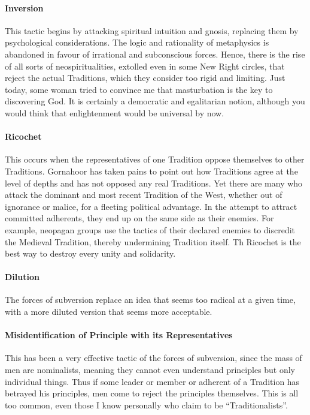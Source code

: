 \paragraph{Inversion}


This tactic begins by attacking spiritual intuition and gnosis, replacing them by psychological considerations. The logic and rationality of metaphysics is abandoned in favour of irrational and subconscious forces. Hence, there is the rise of all sorts of neospiritualities, extolled even in some New Right circles, that reject the actual Traditions, which they consider too rigid and limiting. Just today, some woman tried to convince me that masturbation is the key to discovering God. It is certainly a democratic and egalitarian notion, although you would think that enlightenment would be universal by now.

\paragraph{Ricochet}


This occurs when the representatives of one Tradition oppose themselves to other Traditions. Gornahoor has taken pains to point out how Traditions agree at the level of depths and has not opposed any real Traditions. Yet there are many who attack the dominant and most recent Tradition of the West, whether out of ignorance or malice, for a fleeting political advantage. In the attempt to attract committed adherents, they end up on the same side as their enemies. For example, neopagan groups use the tactics of their declared enemies to discredit the Medieval Tradition, thereby undermining Tradition itself. Th Ricochet is the best way to destroy every unity and solidarity.

\paragraph{Dilution}

The forces of subversion replace an idea that seems too radical at a given time, with a more diluted version that seems more acceptable.

\paragraph{Misidentification of Principle with its Representatives}


This has been a very effective tactic of the forces of subversion, since the mass of men are nominalists, meaning they cannot even understand principles but only individual things. Thus if some leader or member or adherent of a Tradition has betrayed his principles, men come to reject the principles themselves. This is all too common, even those I know personally who claim to be ``Traditionalists''.


